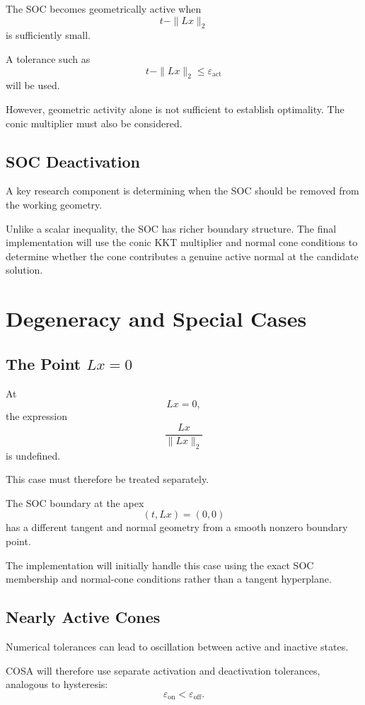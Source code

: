 \documentclass[11pt,a4paper]{article}
\begin{document}
The SOC becomes geometrically active when
\[
t-\|Lx\|_2
\]
is sufficiently small.

A tolerance such as
\[
t-\|Lx\|_2\leq\varepsilon_{\mathrm{act}}
\]
will be used.

However, geometric activity alone is not sufficient to establish
optimality. The conic multiplier must also be considered.

\subsection{SOC Deactivation}

A key research component is determining when the SOC should be
removed from the working geometry.

Unlike a scalar inequality, the SOC has richer boundary structure.
The final implementation will use the conic KKT multiplier and normal
cone conditions to determine whether the cone contributes a genuine
active normal at the candidate solution.

\section{Degeneracy and Special Cases}

\subsection{The Point $Lx=0$}

At
\[
Lx=0,
\]
the expression
\[
\frac{Lx}{\|Lx\|_2}
\]
is undefined.

This case must therefore be treated separately.

The SOC boundary at the apex
\[
(t,Lx)=(0,0)
\]
has a different tangent and normal geometry from a smooth nonzero
boundary point.

The implementation will initially handle this case using the exact
SOC membership and normal-cone conditions rather than a tangent
hyperplane.

\subsection{Nearly Active Cones}

Numerical tolerances can lead to oscillation between active and
inactive states.

COSA will therefore use separate activation and deactivation
tolerances, analogous to hysteresis:
\[
\varepsilon_{\mathrm{on}}
<
\varepsilon_{\mathrm{off}}.
\]
\end{document}
